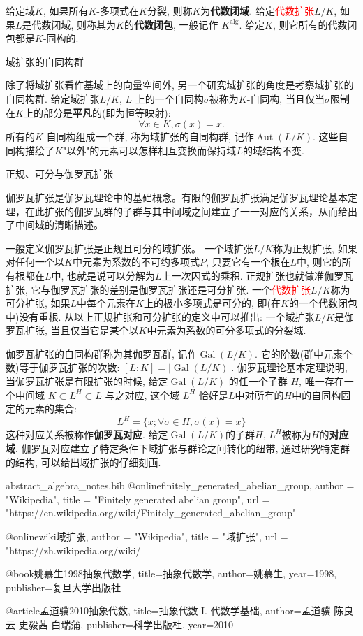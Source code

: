 \documentclass[UTF8]{ctexart}
\DeclareMathOperator{\Aut}{Aut}
\DeclareMathOperator{\Gal}{Gal}
\begin{document}
\begin{enumerate}
给定域$K$, 如果所有$K$-多项式在$K$分裂, 则称$K$为\textbf{代数闭域}. 给定\textcolor{red}{代数扩张}$L/K$, 如果$L$是代数闭域, 则称其为$K$的\textbf{代数闭包}, 一般记作 $K^{\mathrm{alg}}$. 给定$K$, 则它所有的代数闭包都是$K$-同构的.

域扩张的自同构群

除了将域扩张看作基域上的向量空间外, 另一个研究域扩张的角度是考察域扩张的自同构群. 给定域扩张$L/K$, $L$ 上的一个自同构$\sigma$被称为$K$-自同构, 当且仅当$\sigma$限制在$K$上的部分是\textbf{平凡}的(即为恒等映射):
\[
\forall x\in K, \sigma(x) = x.
\]
所有的$K$-自同构组成一个群, 称为域扩张的自同构群, 记作$\Aut(L/K)$. 这些自同构描绘了$K$"以外"的元素可以怎样相互变换而保持域$L$的域结构不变.

正规、可分与伽罗瓦扩张

伽罗瓦扩张是伽罗瓦理论中的基础概念。有限的伽罗瓦扩张满足伽罗瓦理论基本定理，在此扩张的伽罗瓦群的子群与其中间域之间建立了一一对应的关系，从而给出了中间域的清晰描述。

一般定义伽罗瓦扩张是正规且可分的域扩张。 一个域扩张$L/K$称为正规扩张, 如果对任何一个以$K$中元素为系数的不可约多项式$P$, 只要它有一个根在$L$中, 则它的所有根都在$L$中, 也就是说可以分解为$L$上一次因式的乘积. 正规扩张也就做准伽罗瓦扩张, 它与伽罗瓦扩张的差别是伽罗瓦扩张还是可分扩张. 一个\textcolor{red}{代数扩张}$L/K$称为可分扩张, 如果$L$中每个元素在$K$上的极小多项式是可分的, 即(在$K$的一个代数闭包中)没有重根. 从以上正规扩张和可分扩张的定义中可以推出: 一个域扩张$L/K$是伽罗瓦扩张, 当且仅当它是某个以$K$中元素为系数的可分多项式的分裂域.

伽罗瓦扩张的自同构群称为其伽罗瓦群, 记作$\Gal(L/K)$. 它的阶数(群中元素个数)等于伽罗瓦扩张的次数: $[L:K] = \left|\Gal(L/K)\right|$. 伽罗瓦理论基本定理说明, 当伽罗瓦扩张是有限扩张的时候, 给定$\Gal(L/K)$ 的任一个子群 $H$, 唯一存在一个中间域 $K\subset L^{H} \subset L$ 与之对应, 这个域 $L^{H}$ 恰好是$L$中对所有的$H$中的自同构固定的元素的集合:
\[
L^{H} = \{x;\forall\sigma\in H, \sigma(x) = x\}
\]
这种对应关系被称作\textbf{伽罗瓦对应}. 给定$\Gal(L/K)$的子群$H$, $L^{H}$被称为$H$的\textbf{对应域}. 伽罗瓦对应建立了特定条件下域扩张与群论之间转化的纽带, 通过研究特定群的结构, 可以给出域扩张的仔细刻画.
\end{enumerate}

\begin{filecontents*}{abstract_algebra_notes.bib}
@online{finitely_generated_abelian_group,
author = "Wikipedia",
title = "Finitely generated abelian group",
url = "https://en.wikipedia.org/wiki/Finitely_generated_abelian_group"
}

@online{wiki域扩张,
author = "Wikipedia",
title = "域扩张",
url = "https://zh.wikipedia.org/wiki/%
}

@book{姚慕生1998抽象代数学,
  title={抽象代数学},
  author={姚慕生},
  year={1998},
  publisher={复旦大学出版社}
}

@article{孟道骥2010抽象代数,
  title={抽象代数 I. 代数学基础},
  author={孟道骥 陈良云 史毅茜  白瑞蒲},
  publisher={科学出版杜},
  year={2010}
}

\end{filecontents*}

\newpage
\printbibliography
\end{document}
